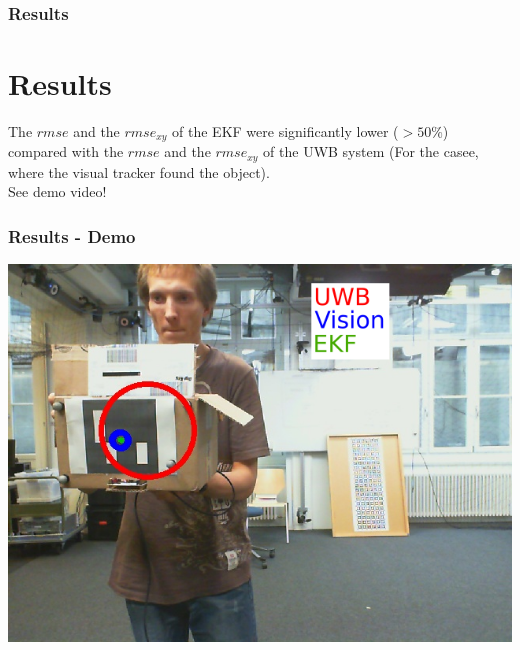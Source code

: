 \documentclass{beamer}[10]
\begin{document}
\begin{frame}
	\frametitle{Results}
	\section{Results}
	 The $\textit{rmse}$ and the $\textit{rmse}_{xy}$ of the EKF were significantly lower ($> 50\%$) compared with the $\textit{rmse}$ and the $\textit{rmse}_{xy}$ of the UWB system (For the casee, where the visual tracker found the object).\\
	\vspace{1cm}
	See demo video!
\end{frame}

\begin{frame}
\frametitle{Results - Demo}
\begin{center}
\href{run:demo_cut_resize.mkv?autostart&start=0}{\includegraphics[width=0.9\linewidth]{gfx/2d_output}}
\end{center}
\end{frame}
\end{document}
